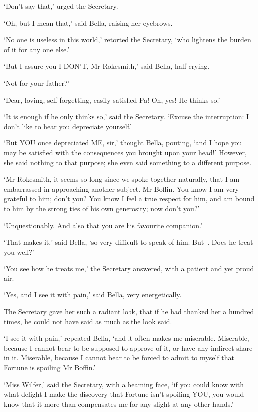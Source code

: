 ‘Don’t say that,’ urged the Secretary.

‘Oh, but I mean that,’ said Bella, raising her eyebrows.

‘No one is useless in this world,’ retorted the Secretary, ‘who lightens
the burden of it for any one else.’

‘But I assure you I DON’T, Mr Rokesmith,’ said Bella, half-crying.

‘Not for your father?’

‘Dear, loving, self-forgetting, easily-satisfied Pa! Oh, yes! He thinks
so.’

‘It is enough if he only thinks so,’ said the Secretary. ‘Excuse the
interruption: I don’t like to hear you depreciate yourself.’

‘But YOU once depreciated ME, sir,’ thought Bella, pouting, ‘and I hope
you may be satisfied with the consequences you brought upon your head!’
However, she said nothing to that purpose; she even said something to a
different purpose.

‘Mr Rokesmith, it seems so long since we spoke together naturally, that
I am embarrassed in approaching another subject. Mr Boffin. You know I
am very grateful to him; don’t you? You know I feel a true respect for
him, and am bound to him by the strong ties of his own generosity; now
don’t you?’

‘Unquestionably. And also that you are his favourite companion.’

‘That makes it,’ said Bella, ‘so very difficult to speak of him. But--.
Does he treat you well?’

‘You see how he treats me,’ the Secretary answered, with a patient and
yet proud air.

‘Yes, and I see it with pain,’ said Bella, very energetically.

The Secretary gave her such a radiant look, that if he had thanked her a
hundred times, he could not have said as much as the look said.

‘I see it with pain,’ repeated Bella, ‘and it often makes me miserable.
Miserable, because I cannot bear to be supposed to approve of it, or
have any indirect share in it. Miserable, because I cannot bear to be
forced to admit to myself that Fortune is spoiling Mr Boffin.’

‘Miss Wilfer,’ said the Secretary, with a beaming face, ‘if you could
know with what delight I make the discovery that Fortune isn’t spoiling
YOU, you would know that it more than compensates me for any slight at
any other hands.’

